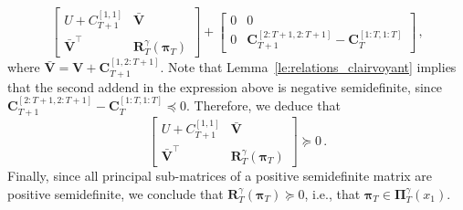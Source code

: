 \documentclass[conference]{IEEEtran}
\begin{document}
    \begin{equation*}
        \begin{bmatrix}
            U + C_{T+1}^{[1, 1]} & \bar{\mathbf{V}}\\
            \bar{\mathbf{V}}^\top & \mathbf{R}_T^\gamma(\bm{\pi}_{T})
        \end{bmatrix}
        +
        \begin{bmatrix}
            0 & 0\\
            0 & \mathbf{C}_{T+1}^{[2:T+1, 2:T+1]} - \mathbf{C}_{T}^{[1:T, 1:T]}
        \end{bmatrix}\,,%
    \end{equation*}
    where $\bar{\mathbf{V}} = \mathbf{V} + \mathbf{C}_{T+1}^{[1, 2:T+1]}$. Note that Lemma~\ref{le:relations_clairvoyant} implies that the second addend in the expression above is negative semidefinite, since $\mathbf{C}_{T+1}^{[2:T+1, 2:T+1]} - \mathbf{C}_{T}^{[1:T, 1:T]} \preceq 0$. Therefore, we deduce that
    \begin{equation*}
        \begin{bmatrix}
            U + C_{T+1}^{[1, 1]} & \bar{\mathbf{V}}\\
            \bar{\mathbf{V}}^\top & \mathbf{R}_T^\gamma(\bm{\pi}_{T})
        \end{bmatrix} \succeq
        0\,.
    \end{equation*}
    Finally, since all principal sub-matrices of a positive semidefinite matrix are positive semidefinite, we conclude that $\mathbf{R}_T^\gamma(\bm{\pi}_T) \succeq 0$, i.e., that $\bm{\pi}_T \in \bm{\Pi}_T^\gamma(x_1)$.
\end{document}
